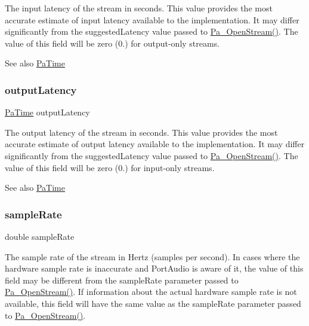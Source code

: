The input latency of the stream in seconds. This value provides the most accurate estimate of input latency available to the implementation. It may differ significantly from the suggested\+Latency value passed to \hyperlink{portaudio_8h_a443ad16338191af364e3be988014cbbe}{Pa\+\_\+\+Open\+Stream()}. The value of this field will be zero (0.) for output-\/only streams. \begin{DoxySeeAlso}{See also}
\hyperlink{portaudio_8h_af17a7e6d0471a23071acf8dbd7bbe4bd}{Pa\+Time} 
\end{DoxySeeAlso}
\mbox{\label{struct_pa_stream_info_ae85fa64f5671c4acd548908a56f9f451}} 
\subsubsection{\texorpdfstring{output\+Latency}{outputLatency}}
{\footnotesize\ttfamily \hyperlink{portaudio_8h_af17a7e6d0471a23071acf8dbd7bbe4bd}{Pa\+Time} output\+Latency}

The output latency of the stream in seconds. This value provides the most accurate estimate of output latency available to the implementation. It may differ significantly from the suggested\+Latency value passed to \hyperlink{portaudio_8h_a443ad16338191af364e3be988014cbbe}{Pa\+\_\+\+Open\+Stream()}. The value of this field will be zero (0.) for input-\/only streams. \begin{DoxySeeAlso}{See also}
\hyperlink{portaudio_8h_af17a7e6d0471a23071acf8dbd7bbe4bd}{Pa\+Time} 
\end{DoxySeeAlso}
\mbox{\label{struct_pa_stream_info_a2bd79d2ab2dfb6aeaf75c2878ad30e1f}} 
\subsubsection{\texorpdfstring{sample\+Rate}{sampleRate}}
{\footnotesize\ttfamily double sample\+Rate}

The sample rate of the stream in Hertz (samples per second). In cases where the hardware sample rate is inaccurate and Port\+Audio is aware of it, the value of this field may be different from the sample\+Rate parameter passed to \hyperlink{portaudio_8h_a443ad16338191af364e3be988014cbbe}{Pa\+\_\+\+Open\+Stream()}. If information about the actual hardware sample rate is not available, this field will have the same value as the sample\+Rate parameter passed to \hyperlink{portaudio_8h_a443ad16338191af364e3be988014cbbe}{Pa\+\_\+\+Open\+Stream()}. \mbox{\label{struct_pa_stream_info_a427b2098449590745eb8e4443f0b4ef8}} 
